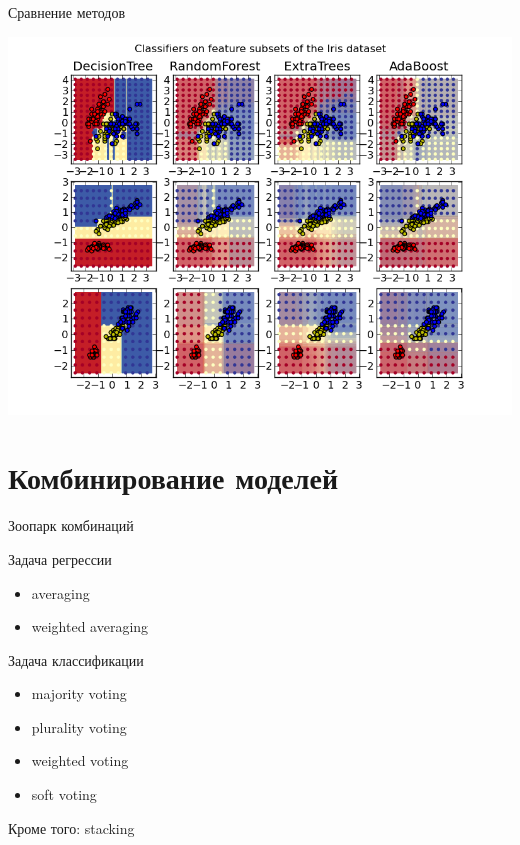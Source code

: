 \documentclass[10pt,a4paper]{beamer}
\begin{document}

\begin{frame}{Сравнение методов}

\begin{center}
\includegraphics[scale=0.45]{images/comp.png}
\end{center}

\end{frame}


\section{Комбинирование моделей}


\begin{frame}{Зоопарк комбинаций}

Задача регрессии
\begin{itemize}
\item averaging
\item weighted averaging
\end{itemize}

Задача классификации
\begin{itemize}
\item majority voting
\item plurality voting
\item weighted voting
\item soft voting
\end{itemize}

Кроме того: stacking

\end{frame}
\end{document}

